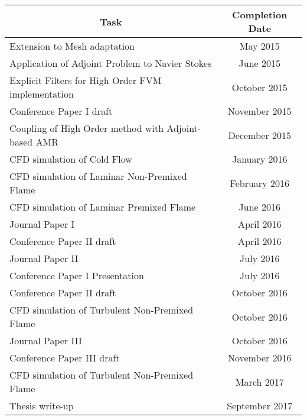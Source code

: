 \begin{tabular}{|l|c|} \hline
\multicolumn{1}{|c|}{\bf{Task}} & \multicolumn{1}{|c|}{\bf{Completion Date}} \\

\hline Extension to Mesh adaptation & May 2015\\

\hline Application of Adjoint Problem to Navier Stokes  & June 2015\\

\hline Explicit Filters for High Order FVM implementation  & October 2015\\

\hline Conference Paper I draft & November 2015\\

\hline Coupling of High Order method with Adjoint-based AMR & December 2015\\

\hline CFD simulation of Cold Flow & January 2016\\

\hline CFD simulation of Laminar Non-Premixed Flame & February 2016\\

\hline CFD simulation of Laminar Premixed Flame & June 2016\\

\hline Journal Paper I & April 2016\\

\hline Conference Paper II draft & April 2016\\

\hline Journal Paper II & July 2016\\

\hline Conference Paper I Presentation  & July 2016\\

\hline Conference Paper II draft  & October 2016\\

\hline CFD simulation of Turbulent Non-Premixed Flame & October 2016\\

\hline Journal Paper III & October 2016\\

\hline Conference Paper III draft  & November 2016\\

\hline CFD simulation of Turbulent Non-Premixed Flame & March 2017\\

\hline Thesis write-up & September 2017 \\ 

\hline

\end{tabular}
